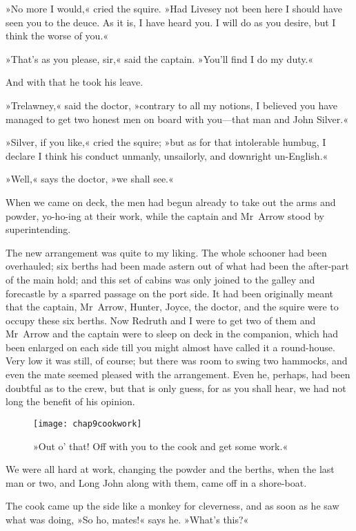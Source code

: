»No more I would,« cried the squire. »Had Livesey not been here I should have seen you to the deuce. As it is, I have heard you. I will do as you desire, but I think the worse of you.«

»That's as you please, sir,« said the captain. »You'll find I do my duty.«

And with that he took his leave.

»Trelawney,« said the doctor, »contrary to all my notions, I believed you have managed to get two honest men on board with you—that man and John Silver.«

»Silver, if you like,« cried the squire; »but as for that intolerable humbug, I declare I think his conduct unmanly, unsailorly, and downright un-English.«

»Well,« says the doctor, »we shall see.«

When we came on deck, the men had begun already to take out the arms and powder, yo-ho-ing at their work, while the captain and Mr~Arrow stood by superintending.

The new arrangement was quite to my liking. The whole schooner had been overhauled; six berths had been made astern out of what had been the after-part of the main hold; and this set of cabins was only joined to the galley and forecastle by a sparred passage on the port side. It had been originally meant that the captain, Mr~Arrow, Hunter, Joyce, the doctor, and the squire were to occupy these six berths. Now Redruth and I were to get two of them and Mr~Arrow and the captain were to sleep on deck in the companion, which had been enlarged on each side till you might almost have called it a round-house. Very low it was still, of course; but there was room to swing two hammocks, and even the mate seemed pleased with the arrangement. Even he, perhaps, had been doubtful as to the crew, but that is only guess, for as you shall hear, we had not long the benefit of his opinion.

\begin{figure}[p]
\centering
\texttt{[image: chap9cookwork]}
\caption[»Off with you to the cook and get some work.«]{»Out o' that! Off with you to the cook and get some work.«}
\end{figure}

We were all hard at work, changing the powder and the berths, when the last man or two, and Long John along with them, came off in a shore-boat.

The cook came up the side like a monkey for cleverness, and as soon as he saw what was doing, »So ho, mates!« says he. »What's this?«

